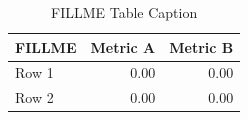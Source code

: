 \begin{table}[!t]
\centering
\caption{FILLME Table Caption}
\label{tab:fillme}
\begin{tabular}{lrr}
\toprule
FILLME & Metric A & Metric B \\
\midrule
Row 1 & 0.00 & 0.00 \\
Row 2 & 0.00 & 0.00 \\
\bottomrule
\end{tabular}
\end{table}
